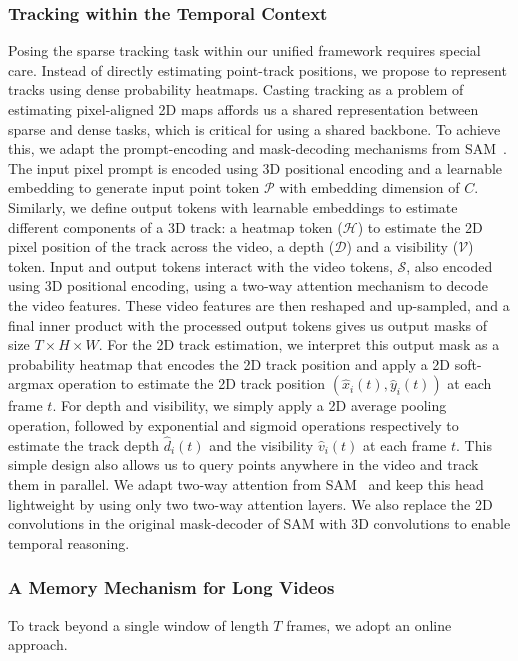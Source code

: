 \subsubsection{Tracking within the Temporal Context}\label{sec:windowTrack}
Posing the sparse tracking task within our unified framework requires special care. 
Instead of directly estimating point-track positions, we propose to represent tracks using dense probability heatmaps.
Casting tracking as a problem of estimating pixel-aligned 2D maps affords us a shared representation between sparse and dense tasks, which is critical for using a shared backbone.
To achieve this, we adapt the prompt-encoding and mask-decoding mechanisms from SAM~\cite{kirillov2023SAM}.
The input pixel prompt is encoded using 3D positional encoding and a learnable embedding to generate input point token $\mathcal{P}$ with embedding dimension of $C$.
Similarly, we define output tokens with learnable embeddings to estimate different components of a 3D track: a heatmap token ($\mathcal{H}$) to estimate the 2D pixel position of the track across the video, a depth ($\mathcal{D}$) and a visibility ($\mathcal{V}$) token. 
Input and output tokens interact with the video tokens, $\mathcal{S}$, also encoded using 3D positional encoding, using a two-way attention mechanism to decode the video features.
These video features are then reshaped and up-sampled, and a final inner product with the processed output tokens gives us output masks of size $T \times H \times W$.
For the 2D track estimation, we interpret this output mask as a probability heatmap that encodes the 2D track position and apply a 2D soft-argmax operation to estimate the 2D track position $(\hat{x}_i(t),\hat{y}_i(t))$ at each frame $t$.
For depth and visibility, we simply apply a 2D average pooling operation, followed by exponential and sigmoid operations respectively to estimate the track depth $\hat{d}_i(t)$ and the visibility $\hat{v}_i(t)$ at each frame $t$.
This simple design also allows us to query points anywhere in the video and track them in parallel.
We adapt two-way attention from SAM~\cite{kirillov2023SAM} and keep this head lightweight by using only two two-way attention layers.
We also replace the 2D convolutions in the original mask-decoder of SAM with 3D convolutions to enable temporal reasoning.

\subsubsection{A Memory Mechanism for Long Videos}\label{sec:memory} 
To track beyond a single window of length $T$ frames, we adopt an online approach.

